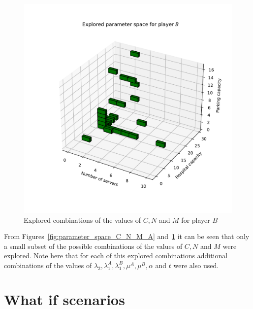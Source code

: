 \begin{figure}[H]
    \centering
    \includegraphics[width=\linewidth]{chapters/05_numerical_results/Bin/explored_parameters_2.pdf}
    \caption{Explored combinations of the values of \(C, N\) and \(M\) for
    player \(B\)}
    \label{fig:parameter_space_C_N_M_B}
\end{figure}

From Figures~\ref{fig:parameter_space_C_N_M_A}
and~\ref{fig:parameter_space_C_N_M_B} it can be seen that only a small subset
of the possible combinations of the values of \(C, N\) and \(M\) were explored.
Note here that for each of this explored combinations additional combinations
of the values of \(\lambda_2, \lambda_1^A, \lambda_1^B, \mu^A, \mu^B, \alpha\)
and \(t\) were also used.


\section{What if scenarios}\label{sec:results_what_if}

